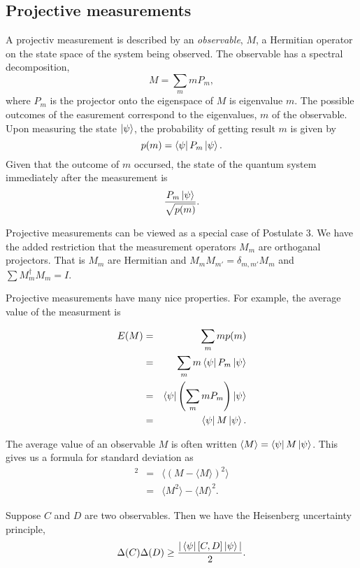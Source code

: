 \documentclass{article}
\begin{document}
\subsection{Projective measurements}

\begin{definition}
  A projectiv measurement is described by an \textit{observable}, $M$, a Hermitian operator on the state space of the system being observed. The observable has a spectral decomposition,
  \[M=\sum_m mP_m,\]
  where $P_m$ is the projector onto the eigenspace of $M$ is eigenvalue $m$. The possible outcomes of the easurement correspond to the eigenvalues, $m$ of the observable. Upon measuring the state $\ket\psi$, the probability of getting result $m$ is given by
  \[p(m)=\bra\psi P_m\ket\psi.\]
  Given that the outcome of $m$ occursed, the state of the quantum system immediately after the measurement is
  \[\frac{P_m\ket\psi}{\sqrt{p(m)}}.\]
\end{definition}

Projective measurements can be viewed as a special case of Postulate 3. We have the added restriction that the measurement operators $M_m$ are orthoganal projectors. That is $M_m$ are Hermitian and $M_m M_{m'}=\delta_{m,m'}M_m$ and $\sum M_m^\dagger M_m=I$.

Projective measurements have many nice properties. For example, the average value of the measurment is

\begin{eqnarray*}
  E(M)&=&\sum_m mp(m) \\
  &=&\sum_m m\bra{\psi}P_m\ket{\psi} \\
  &=&\bra{\psi}\left(\sum_m mP_m\right)\ket\psi\\
  &=&\bra\psi M\ket\psi.
\end{eqnarray*}

The average value of an observable $M$ is often written $\langle M\rangle =\bra\psi M\ket\psi$. This gives us a formula for standard deviation as
\begin{eqnarray*}
  [\Delta(M)]^2&=&\langle(M-\langle M\rangle)^2\rangle \\
  &=&\langle M^2\rangle-\langle M\rangle^2.
\end{eqnarray*}

\begin{theorem}
  Suppose $C$ and $D$ are two observables. Then we have the Heisenberg uncertainty principle,
  \[\Delta(C)\Delta(D)\ge \frac{|\bra\psi [C,D]\ket\psi|}{2}.\]
\end{theorem}
\end{document}
